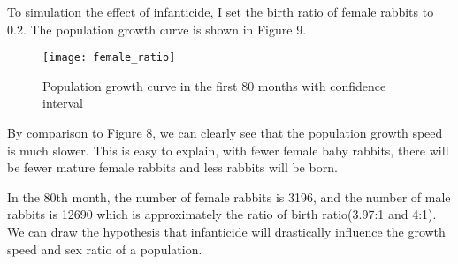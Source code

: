 \documentclass{article}
\begin{document}
    To simulation the effect of infanticide, I set the birth ratio of female rabbits to 0.2. The population growth curve is shown in Figure 9.
    
    \begin{figure}
        \centering
        \texttt{[image: female\_ratio]}
        \caption{Population growth curve in the first 80 months with confidence interval}
    \end{figure}
    
    By comparison to Figure 8, we can clearly see that the population growth speed is much slower. This is easy to explain, with fewer female baby rabbits, there will be fewer mature female rabbits and less rabbits will be born.
    
    In the 80th month, the number of female rabbits  is 3196, and the number of male rabbits is 12690 which is approximately the ratio of birth ratio(3.97:1 and 4:1). We can draw the hypothesis that infanticide will drastically influence the growth speed and sex ratio of a population.

    
\end{document}
